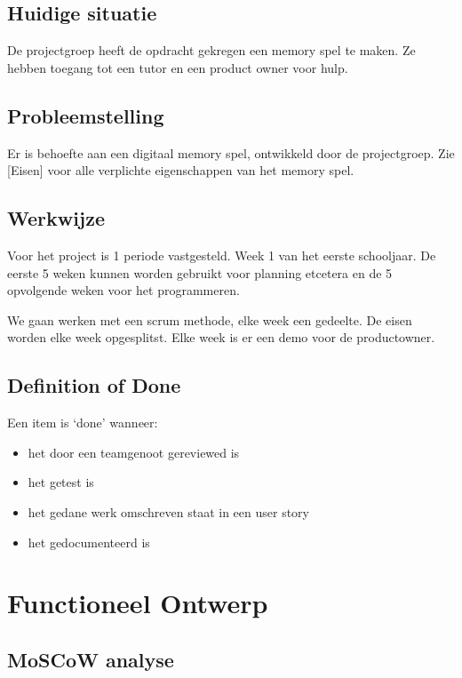 \documentclass[a4paper,titlepage,11pt]{article}
\begin{document}
\subsection{Huidige situatie}

De projectgroep heeft de opdracht gekregen een memory spel te maken. Ze hebben toegang tot een tutor en een product owner voor hulp.

\subsection{Probleemstelling}

Er is behoefte aan een digitaal memory spel, ontwikkeld door de projectgroep. Zie [Eisen] voor alle verplichte eigenschappen van het memory spel.

\subsection{Werkwijze}

Voor het project is 1 periode vastgesteld. Week 1 van het eerste schooljaar. De eerste 5 weken kunnen worden gebruikt voor planning etcetera en de 5 opvolgende weken voor het programmeren.

We gaan werken met een scrum methode, elke week een gedeelte. De eisen worden elke week opgesplitst. Elke week is er een demo voor de productowner.

\subsection{Definition of Done}

Een item is `done' wanneer:

\begin{itemize}

\item het door een teamgenoot gereviewed is
\item het getest is
\item het gedane werk omschreven staat in een user story
\item het gedocumenteerd is
\end{itemize}

\clearpage

\section{Functioneel Ontwerp}

\subsection{MoSCoW analyse}
\end{document}
